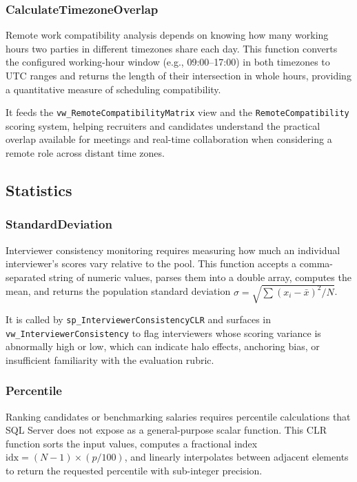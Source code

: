 \documentclass[11pt,a4paper]{article}
\begin{document}
\subsubsection{CalculateTimezoneOverlap}
\noindent
Remote work compatibility analysis depends on knowing how many working hours two parties in different timezones share each day. This function converts the configured working-hour window (e.g., 09:00--17:00) in both timezones to UTC ranges and returns the length of their intersection in whole hours, providing a quantitative measure of scheduling compatibility.

It feeds the \texttt{vw\_RemoteCompatibilityMatrix} view and the \texttt{RemoteCompatibility} scoring system, helping recruiters and candidates understand the practical overlap available for meetings and real-time collaboration when considering a remote role across distant time zones.

\subsection{Statistics}

\subsubsection{StandardDeviation}
\noindent
Interviewer consistency monitoring requires measuring how much an individual interviewer's scores vary relative to the pool. This function accepts a comma-separated string of numeric values, parses them into a double array, computes the mean, and returns the population standard deviation $\sigma = \sqrt{\sum(x_i - \bar{x})^2 / N}$.

It is called by \texttt{sp\_InterviewerConsistencyCLR} and surfaces in \texttt{vw\_InterviewerConsistency} to flag interviewers whose scoring variance is abnormally high or low, which can indicate halo effects, anchoring bias, or insufficient familiarity with the evaluation rubric.

\subsubsection{Percentile}
\noindent
Ranking candidates or benchmarking salaries requires percentile calculations that SQL Server does not expose as a general-purpose scalar function. This CLR function sorts the input values, computes a fractional index $\text{idx} = (N-1) \times (p / 100)$, and linearly interpolates between adjacent elements to return the requested percentile with sub-integer precision.
\end{document}
